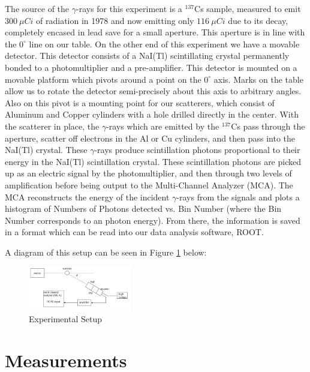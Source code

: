 \documentclass[%
 reprint,
 amsmath,amssymb,
 aps,
 pra,
]{revtex4-1}
\begin{document}
The source of the $\gamma$-rays for this experiment is a $^{137}$Cs sample, measured to emit $300~\mu Ci$ of radiation in 1978 and now emitting only $116~\mu Ci$ due to its decay, completely encased in lead save for a small aperture. This aperture is in line with the $0^\circ$ line on our table. On the other end of this experiment we have a movable detector. This detector consists of a NaI(Tl) scintillating crystal permanently bonded to a photomultiplier and a pre-amplifier. This detector is mounted on a movable platform which pivots around a point on the $0^\circ$ axis. Marks on the table allow us to rotate the detector semi-precisely about this axis to arbitrary angles. Also on this pivot is a mounting point for our scatterers, which consist of Aluminum and Copper cylinders with a hole drilled directly in the center. With the scatterer in place, the $\gamma$-rays which are emitted by the $^{137}$Cs pass through the aperture, scatter off electrons in the Al or Cu cylinders, and then pass into the NaI(Tl) crystal. These $\gamma$-rays produce scintillation photons proportional to their energy in the NaI(Tl) scintillation crystal. These scintillation photons are picked up as an electric signal by the photomultiplier, and then through two levels of amplification before being output to the Multi-Channel Analyzer (MCA). The MCA reconstructs the energy of the incident $\gamma$-rays from the signals and plots a histogram of Numbers of Photons detected vs. Bin Number (where the Bin Number corresponds to an photon energy). From there, the information is saved in a format which can be read into our data analysis software, ROOT.

A diagram of this setup can be seen in Figure \ref{Setup} below:
\begin{figure}[H]
	\centering
	\includegraphics[width=0.4\textwidth]{Setup.png}
	\caption{Experimental Setup}
	\label{Setup}
\end{figure}

\section{Measurements}
\end{document}
